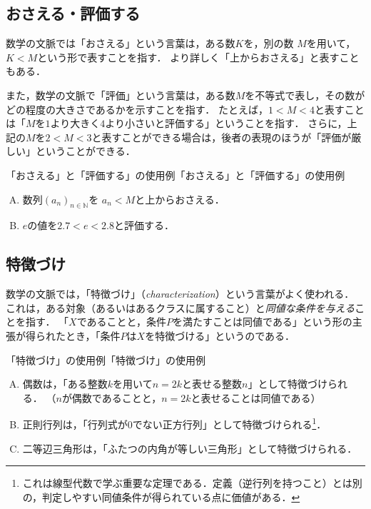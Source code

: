 \subsection{おさえる・評価する}

数学の文脈では「おさえる」という言葉は，ある数$K$を，別の数 $M$を用いて，$K<M$という形で表すことを指す．
より詳しく「上からおさえる」と表すこともある．

また，数学の文脈で「評価」という言葉は，ある数$M$を不等式で表し，その数がどの程度の大きさであるかを示すことを指す．
たとえば，$ 1 < M <4$と表すことは「$M$を$1$より大きく$4$より小さいと評価する」ということを指す．
さらに，上記の$M$を$ 2< M <3$と表すことができる場合は，後者の表現のほうが「評価が厳しい」ということができる．

\begin{example}{「おさえる」と「評価する」の使用例}{「おさえる」と「評価する」の使用例}
  \begin{enumerate}[(A)]
    \item 数列$(a_n)_{n \in \mathbb{N}}$を $ a_n <M$と上からおさえる．
    \item $e$の値を$2.7 < e < 2.8$と評価する．
  \end{enumerate}
\end{example}


\subsection{特徴づけ}

数学の文脈では，「特徴づけ」（\emph{characterization}）という言葉がよく使われる．
これは，ある対象（あるいはあるクラスに属すること）と\emph{同値な条件を与える}ことを指す．
「$X$であることと，条件$P$を満たすことは同値である」という形の主張が得られたとき，「条件$P$は$X$を特徴づける」というのである．

\begin{example}{「特徴づけ」の使用例}{「特徴づけ」の使用例}
  \begin{enumerate}[(A)]
    \item 偶数は，「ある整数$k$を用いて$n=2k$と表せる整数$n$」として特徴づけられる．
    （$n$が偶数であることと，$n=2k$と表せることは同値である）
    \item 正則行列は，「行列式が$0$でない正方行列」として特徴づけられる\footnote{これは線型代数で学ぶ重要な定理である．定義（逆行列を持つこと）とは別の，判定しやすい同値条件が得られている点に価値がある．}．
    \item 二等辺三角形は，「ふたつの内角が等しい三角形」として特徴づけられる．
  \end{enumerate}
\end{example}

